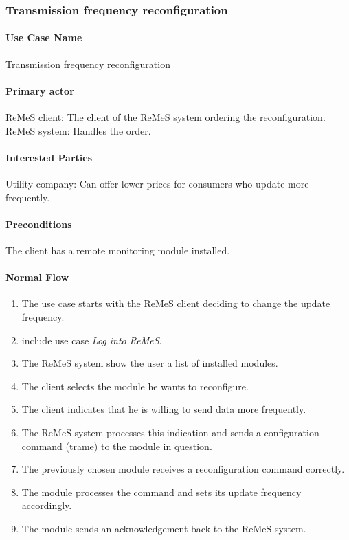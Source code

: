 \subsubsection{Transmission frequency reconfiguration}

\paragraph{Use Case Name}
Transmission frequency reconfiguration
\paragraph{Primary actor}
ReMeS client: The client of the ReMeS system ordering the reconfiguration. \\
ReMeS system: Handles the order.
\paragraph{Interested Parties}
Utility company: Can offer lower prices for consumers who update more frequently.\\
\paragraph{Preconditions}
The client has a remote monitoring module installed.
\paragraph{Normal Flow}
\begin{enumerate}
	\item The use case starts with the ReMeS client deciding to change the update frequency.
	\item include use case \textit{Log into ReMeS}.
	\item The ReMeS system show the user a list of installed modules.
	\item The client selects the module he wants to reconfigure.
	\item The client indicates that he is willing to send data more frequently.
	\item The ReMeS system processes this indication and sends a configuration command (trame) to the module in question.
	\item The previously chosen module receives a reconfiguration command correctly.
	\item The module processes the command and sets its update frequency accordingly.
	\item The module sends an acknowledgement back to the ReMeS system.
\end{enumerate}

